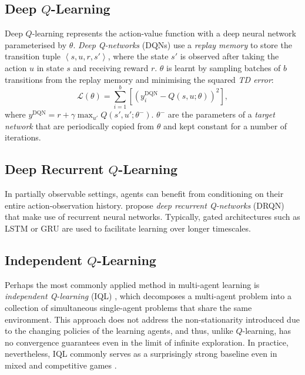 \documentclass[twoside,11pt]{article}
\renewcommand{\cite}{\citep}
\begin{document}
\subsection{Deep $Q$-Learning}

Deep $Q$-learning represents the action-value function with a deep neural network parameterised by $\theta$. \textit{Deep Q-networks} (DQNs) \cite{mnih_human-level_2015} use a  \textit{replay memory} to store the transition tuple $\left\langle s,u,r,s'\right\rangle$, where the state  $s'$  is observed after taking the action $u$ in state $s$ and receiving reward $r$. $\theta$ is learnt by sampling batches of $b$ transitions from the replay memory and minimising the squared \textit{TD error}:
\begin{equation}\label{eq:dqn}
\mathcal{L}(\theta)=\sum\limits_{i=1}^{b}\left[\left(y_i^{\text{DQN}}-Q(s,u;\theta)\right)^2\right],
\end{equation} 
where $y^{\text{DQN}}=r+\gamma\max_{u'} Q(s',u';\theta^-)$. $\theta^-$ are the parameters of a \textit{target network} that are periodically copied from $\theta$ and kept constant for a number of iterations.  

\subsection{Deep Recurrent $Q$-Learning}

In partially observable settings, agents can benefit from conditioning on their entire action-observation history. \citet{hausknecht_deep_2015} propose \textit{deep recurrent Q-networks} (DRQN) that make use of recurrent neural networks. Typically, gated architectures such as LSTM \cite{hochreiter_long_1997} or GRU \cite{chung_empirical_2014} are used to facilitate learning over longer timescales.

\subsection{Independent $Q$-Learning}

Perhaps the most commonly applied method in multi-agent learning is \textit{independent Q-learning} (IQL) \cite{tan_multi-agent_1993}, which decomposes a multi-agent problem into a collection of simultaneous single-agent problems that share the same environment. This approach does not address the non-stationarity introduced due to the changing policies of the learning agents, and thus, unlike $Q$-learning, has no convergence guarantees even in the limit of infinite exploration. In practice, nevertheless, IQL commonly serves as a surprisingly strong baseline even in mixed and competitive games \cite{tampuu_multiagent_2015, leibo_multi-agent_2017}.
\end{document}
